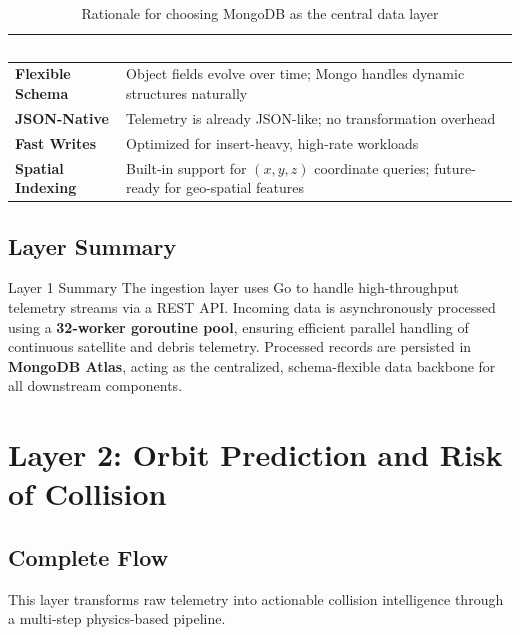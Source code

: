 \documentclass[11pt, a4paper]{article}
\begin{document}
\begin{table}[H]
\centering
\small
\begin{tabularx}{\linewidth}{>{\bfseries}p{3.2cm} X}
\toprule
\rowcolor{spaceblue}\textcolor{white}{\textbf{Feature}} & \textcolor{white}{\textbf{Benefit}} \\
\midrule
Flexible Schema & Object fields evolve over time; Mongo handles dynamic structures naturally \\
\midrule
JSON-Native & Telemetry is already JSON-like; no transformation overhead \\
\midrule
Fast Writes & Optimized for insert-heavy, high-rate workloads \\
\midrule
Spatial Indexing & Built-in support for $(x, y, z)$ coordinate queries; future-ready for geo-spatial features \\
\bottomrule
\end{tabularx}
\caption{Rationale for choosing MongoDB as the central data layer}
\end{table}

\subsection{Layer Summary}

\begin{layerbox}[colframe=safegreen]{Layer 1 Summary}
The ingestion layer uses Go to handle high-throughput telemetry streams via a REST API.
Incoming data is asynchronously processed using a \textbf{32-worker goroutine pool},
ensuring efficient parallel handling of continuous satellite and debris telemetry.
Processed records are persisted in \textbf{MongoDB Atlas}, acting as the centralized,
schema-flexible data backbone for all downstream components.
\end{layerbox}

\section{Layer 2: Orbit Prediction and Risk of Collision}

\subsection{Complete Flow}

This layer transforms raw telemetry into actionable collision intelligence through a multi-step
physics-based pipeline.
\end{document}

